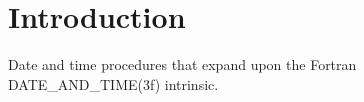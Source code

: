     

    \hypertarget{index_Introduction}{}\section{Introduction}\label{index_Introduction}
Date and time procedures that expand upon the Fortran D\+A\+T\+E\+\_\+\+A\+N\+D\+\_\+\+T\+I\+M\+E(3f) intrinsic.

      